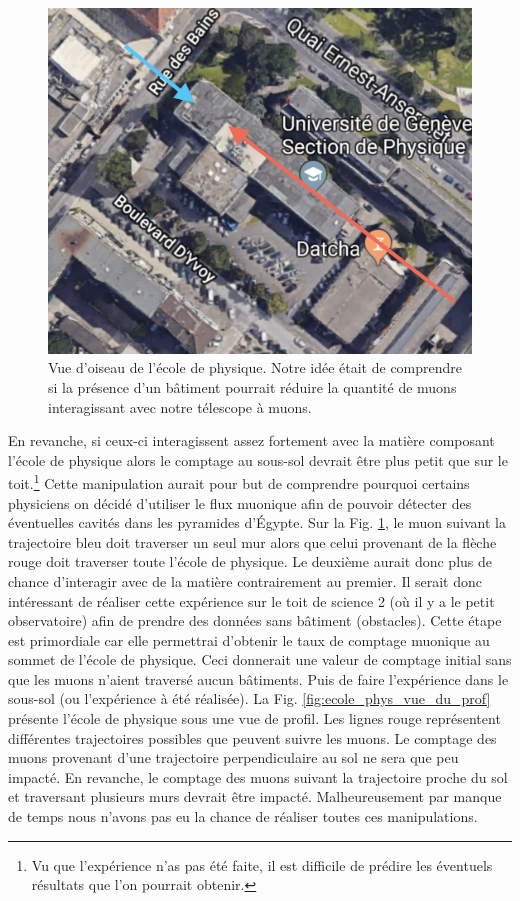 \documentclass[12pt]{article}
\begin{document}
\begin{figure}[htpb!]
    \centering
    \includegraphics[width=0.6\linewidth]{graphiques/experience2/gmap_ecole_phy_vue_dessus.png}
    \captionsetup{width=0.7\textwidth}
    \caption{Vue d'oiseau de l'école de physique. Notre idée était de comprendre si la présence d'un bâtiment pourrait réduire la quantité de muons interagissant avec notre télescope à muons.}
    \label{fig:ecole_phys_vue_du_dessus}
\end{figure}

En revanche, si ceux-ci interagissent assez fortement avec la matière composant l'école de physique alors le comptage au sous-sol devrait être plus petit que sur le toit.\footnote{Vu que l'expérience n'as pas été faite, il est difficile de prédire les éventuels résultats que l'on pourrait obtenir.} Cette manipulation aurait pour but de comprendre pourquoi certains physiciens on décidé d'utiliser le flux muonique afin de pouvoir détecter des éventuelles cavités dans les pyramides d'Égypte. Sur la Fig. \ref{fig:ecole_phys_vue_du_dessus}, le muon suivant la trajectoire bleu doit traverser un seul mur alors que celui provenant de la flèche rouge doit traverser toute l'école de physique. Le deuxième aurait donc plus de chance d'interagir avec de la matière contrairement au premier. Il serait donc intéressant de réaliser cette expérience sur le toit de science 2 (où il y a le petit observatoire) afin de prendre des données sans bâtiment (obstacles). Cette étape est primordiale car elle permettrai d'obtenir le taux de comptage muonique au sommet de l'école de physique. Ceci donnerait une valeur de comptage initial sans que les muons n'aient traversé aucun bâtiments. Puis de faire l'expérience dans le sous-sol (ou l'expérience à été réalisée). La Fig. \ref{fig:ecole_phys_vue_du_prof} présente l'école de physique sous une vue de profil. Les lignes rouge représentent différentes trajectoires possibles que peuvent suivre les muons. Le comptage des muons provenant d'une trajectoire perpendiculaire au sol ne sera que peu impacté. En revanche, le comptage des muons suivant la trajectoire proche du sol et traversant plusieurs murs devrait être impacté. Malheureusement par manque de temps nous n'avons pas eu la chance de réaliser toutes ces manipulations. 
\end{document}

